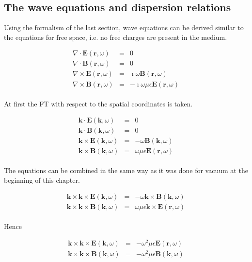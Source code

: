 \documentclass[a4paper,11pt]{thesis}
\begin{document}
\subsection{The wave equations and dispersion relations}
Using the formalism of the last section, wave equations can be derived similar to the equations for free space, i.e. no free charges are present in the medium.

\begin{eqnarray}
\nabla \cdot \mathbf{E}(\mathbf{r},\omega)&=&0 \\
\nabla \cdot \mathbf{B}(\mathbf{r},\omega)&=&0 \\
\nabla \times \mathbf{E}(\mathbf{r},\omega)&=&\imath \omega \mathbf{B}(\mathbf{r},\omega) \\
\nabla \times \mathbf{B}(\mathbf{r},\omega)&=&-  \imath \omega  \mu \epsilon \mathbf{E}(\mathbf{r},\omega)
\end{eqnarray}\\

At first the FT with respect to the spatial coordinates is taken.

\begin{eqnarray}
\mathbf{k} \cdot \mathbf{E}(\mathbf{k},\omega)&=&0 \\
\mathbf{k} \cdot \mathbf{B}(\mathbf{k},\omega)&=&0 \\
\mathbf{k} \times \mathbf{E}(\mathbf{k},\omega)&=&- \omega \mathbf{B}(\mathbf{k},\omega) \\
\mathbf{k} \times \mathbf{B}(\mathbf{k},\omega)&=&  \omega  \mu \epsilon \mathbf{E}(\mathbf{r},\omega)
\end{eqnarray}\\

The equations can be combined in the same way as it was done for vacuum at the beginning of this chapter.

\begin{eqnarray}
\mathbf{k} \times \mathbf{k} \times \mathbf{E}(\mathbf{k},\omega)&=&- \omega \mathbf{k} \times \mathbf{B}(\mathbf{k},\omega) \\
\mathbf{k} \times \mathbf{k} \times \mathbf{B}(\mathbf{k},\omega)&=& \omega  \mu \epsilon \mathbf{k} \times \mathbf{E}(\mathbf{r},\omega)
\end{eqnarray}\\

Hence

\begin{eqnarray}
\mathbf{k} \times \mathbf{k} \times \mathbf{E}(\mathbf{k},\omega)&=&- \omega^2  \mu \epsilon \mathbf{E}(\mathbf{r},\omega) \\
\mathbf{k} \times \mathbf{k} \times \mathbf{B}(\mathbf{k},\omega)&=&- \omega^2  \mu \epsilon    \mathbf{B}(\mathbf{k},\omega)
\end{eqnarray}\\
\end{document}
